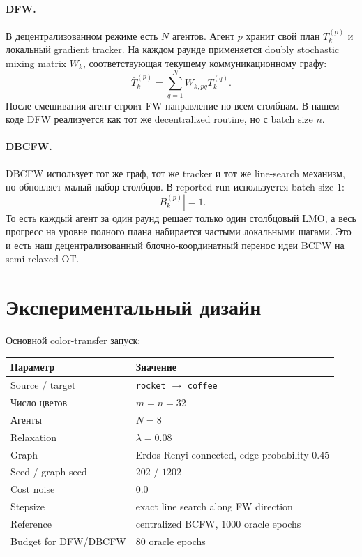 \documentclass[11pt,a4paper]{article}
\newcommand{\1}{\mathbf{1}}
\begin{document}
\paragraph{DFW.}
В децентрализованном режиме есть $N$ агентов. Агент $p$ хранит свой план $T_k^{(p)}$ и локальный gradient tracker. На каждом раунде применяется doubly stochastic mixing matrix $W_k$, соответствующая текущему коммуникационному графу:
\[
  \bar{T}_k^{(p)}=\sum_{q=1}^N W_{k,pq}T_k^{(q)}.
\]
После смешивания агент строит FW-направление по всем столбцам. В нашем коде DFW реализуется как тот же decentralized routine, но с batch size $n$.

\paragraph{DBCFW.}
DBCFW использует тот же граф, тот же tracker и тот же line-search механизм, но обновляет малый набор столбцов. В reported run используется batch size $1$:
\[
  |B_k^{(p)}|=1.
\]
То есть каждый агент за один раунд решает только один столбцовый LMO, а весь прогресс на уровне полного плана набирается частыми локальными шагами. Это и есть наш децентрализованный блочно-координатный перенос идеи BCFW на semi-relaxed OT.

\section{Экспериментальный дизайн}

Основной color-transfer запуск:
\begin{center}
\begin{tabular}{ll}
\toprule
Параметр & Значение \\
\midrule
Source / target & \texttt{rocket} $\to$ \texttt{coffee} \\
Число цветов & $m=n=32$ \\
Агенты & $N=8$ \\
Relaxation & $\lambda=0.08$ \\
Graph & Erdos-Renyi connected, edge probability $0.45$ \\
Seed / graph seed & $202$ / $1202$ \\
Cost noise & $0.0$ \\
Stepsize & exact line search along FW direction \\
Reference & centralized BCFW, $1000$ oracle epochs \\
Budget for DFW/DBCFW & $80$ oracle epochs \\
\bottomrule
\end{tabular}
\end{center}
\end{document}
